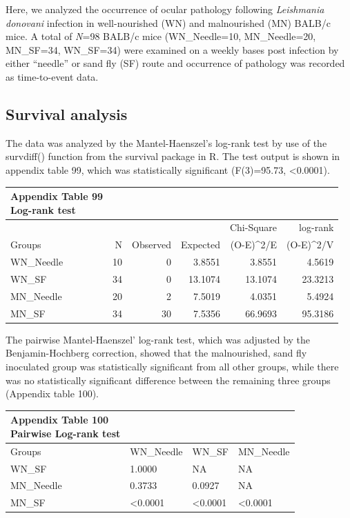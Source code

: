 \documentclass[
  12pt,
  letterpaper,
]{article}
\begin{document}
Here, we analyzed the occurrence of ocular pathology following \emph{Leishmania donovani} infection in well-nourished (WN) and malnourished (MN) BALB/c mice. A total of \emph{N}=98 BALB/c mice (WN\_Needle=10, MN\_Needle=20, MN\_SF=34, WN\_SF=34) were examined on a weekly bases post infection by either ``needle'' or sand fly (SF) route and occurrence of pathology was recorded as time-to-event data.

\subsection{Survival analysis}\label{survival-analysis}

The data was analyzed by the Mantel-Haenszel's log-rank test by use of the survdiff() function from the survival package in R. The test output is shown in appendix table 99, which was statistically significant (F(3)=95.73, \textless0.0001).

\begingroup
\fontsize{12.0pt}{14.4pt}\selectfont
\begin{longtable}{l|rrrrr}
\caption*{
{\large \textbf{Appendix Table 99}} \\ 
{\small \textbf{Log-rank test}}
} \\ 
\toprule
 &  &  &  & Chi-Square & log-rank \\ 
\cmidrule(lr){5-5} \cmidrule(lr){6-6}
Groups & {N} & {Observed} & {Expected} & (O-E)\textasciicircum{}2/E & (O-E)\textasciicircum{}2/V \\ 
\midrule\addlinespace[2.5pt]
WN\_Needle & 10 & 0 & 3.8551 & 3.8551 & 4.5619 \\ 
WN\_SF & 34 & 0 & 13.1074 & 13.1074 & 23.3213 \\ 
MN\_Needle & 20 & 2 & 7.5019 & 4.0351 & 5.4924 \\ 
MN\_SF & 34 & 30 & 7.5356 & 66.9693 & 95.3186 \\ 
\bottomrule
\end{longtable}
\endgroup

The pairwise Mantel-Haenszel' log-rank test, which was adjusted by the Benjamin-Hochberg correction, showed that the malnourished, sand fly inoculated group was statistically significant from all other groups, while there was no statistically significant difference between the remaining three groups (Appendix table 100).

\begingroup
\fontsize{12.0pt}{14.4pt}\selectfont
\begin{longtable}{l|lll}
\caption*{
{\large \textbf{Appendix Table 100}} \\ 
{\small \textbf{Pairwise Log-rank test}}
} \\ 
\toprule
Groups & WN\_Needle & WN\_SF & MN\_Needle \\ 
\midrule\addlinespace[2.5pt]
WN\_SF & 1.0000 & NA & NA \\ 
MN\_Needle & 0.3733 & 0.0927 & NA \\ 
MN\_SF & <0.0001 & <0.0001 & <0.0001 \\ 
\bottomrule
\end{longtable}
\endgroup
\end{document}
